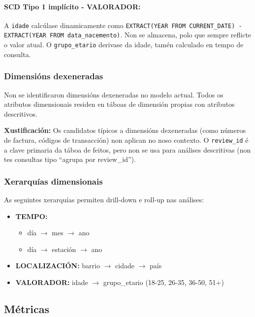 \documentclass[12pt,a4paper]{article}
\begin{document}
\paragraph{SCD Tipo 1 implícito - VALORADOR:}

A \texttt{idade} calcúlase dinamicamente como \texttt{EXTRACT(YEAR FROM CURRENT\_DATE) - EXTRACT(YEAR FROM data\_nacemento)}. Non se almacena, polo que sempre reflicte o valor atual. O \texttt{grupo\_etario} derivase da idade, tamén calculado en tempo de consulta.

\subsubsection{Dimensións dexeneradas}

Non se identificaron dimensións dexeneradas no modelo actual. Todos os atributos dimensionais residen en táboas de dimensión propias con atributos descritivos.

\textbf{Xustificación:}
Os candidatos típicos a dimensións dexeneradas (como números de factura, códigos de transacción) non aplican no noso contexto. O \texttt{review\_id} é a clave primaria da táboa de feitos, pero non se usa para análises descritivas (non tes consultas tipo ``agrupa por review\_id'').

\subsubsection{Xerarquías dimensionais}

As seguintes xerarquías permiten drill-down e roll-up nas análises:

\begin{itemize}
	\item \textbf{TEMPO:} 
	\begin{itemize}
	    \item día $\rightarrow$ mes $\rightarrow$ ano
	    \item día $\rightarrow$ estación $\rightarrow$ ano
	\end{itemize}
	\item \textbf{LOCALIZACIÓN:} barrio $\rightarrow$ cidade $\rightarrow$ país
	\item \textbf{VALORADOR:} idade $\rightarrow$ grupo\_etario (18-25, 26-35, 36-50, 51+)
\end{itemize}

\subsection{Métricas}
\end{document}
